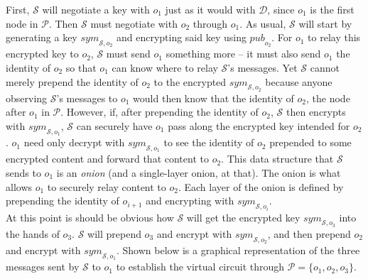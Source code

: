 \documentclass[10pt]{report}
\begin{document}
First, $\mathcal{S}$ will negotiate a key with $o_1$ just as it would with $\mathcal{D}$, since $o_1$ is the
first node in $\mathcal{P}$.  Then $\mathcal{S}$ must negotiate with $o_2$ through $o_1$. As usual, $\mathcal{S}$
will start by generating a key $\mathit{sym}_{\mathcal{S},o_2}$ and encrypting said key using $\mathit{pub}_{o_2}$.
For $o_1$ to relay this encrypted key to $o_2$, $\mathcal{S}$ must send $o_1$ something more -- it must also
send $o_1$ the identity of $o_2$ so that $o_1$ can know where to relay $\mathcal{S}$'s messages.  Yet
$\mathcal{S}$ cannot merely prepend the identity of $o_2$ to the encrypted $\mathit{sym}_{\mathcal{S},o_2}$
because anyone observing $\mathcal{S}$'s messages to $o_1$ would then know that the identity of $o_2$, the node
after $o_1$ in $\mathcal{P}$.  However, if, after prepending the identity of $o_2$, $\mathcal{S}$ then encrypts with
$\mathit{sym}_{\mathcal{S},o_1}$, $\mathcal{S}$ can securely have $o_1$ pass along the encrypted key intended
for $o_2$.  $o_1$ need only decrypt with $\mathit{sym}_{\mathcal{S},o_1}$ to see the identity of $o_2$ prepended
to some encrypted content and forward that content to $o_2$.  This data structure that $\mathcal{S}$ sends to
$o_1$ is an \textit{onion} (and a single-layer onion, at that).  The onion is what allows $o_1$ to securely
relay content to $o_2$.  Each layer of the onion is defined by prepending the identity of $o_{i+1}$ and encrypting
with $\mathit{sym}_{\mathcal{S}, o_i}$.\\

At this point is should be obvious how $\mathcal{S}$ will get the encrypted key $\mathit{sym}_{\mathcal{S},o_3}$
into the hands of $o_3$.  $\mathcal{S}$ will prepend $o_3$ and encrypt with
$\mathit{sym}_{\mathcal{S},o_2}$, and then prepend $o_2$ and encrypt with $\mathit{sym}_{\mathcal{S},o_1}$.
Shown below is a graphical representation of the three messages sent by $\mathcal{S}$ to $o_1$ to establish
the virtual circuit through $\mathcal{P} = \{o_1, o_2, o_3\}$.
\end{document}
